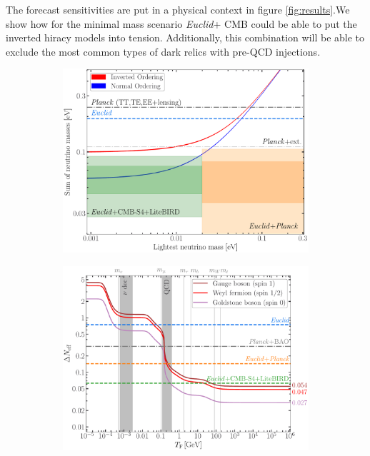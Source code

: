 \documentclass[a4paper,11pt]{article}
\newcommand{\euclid}{\textit{Euclid}\xspace}
\begin{document}
The forecast sensitivities are put in a physical context in figure \ref{fig:results}.We show how for the minimal mass scenario \euclid + CMB could be able to put the inverted hiracy models into tension. Additionally, this combination will be able to exclude the most common types of dark relics with pre-QCD injections.   

\begin{figure}[!htbp]
    \centering
    \begin{subfigure}{0.49\textwidth}
        \centering
        \includegraphics[width=\linewidth]{figure_hierarchy-1.pdf}
    \end{subfigure}
    \hfill
    \begin{subfigure}{0.49\textwidth}
        \centering
        \includegraphics[width=\linewidth]{figure_Neff-1.pdf}

\end{subfigure}
\end{figure}
\end{document}
